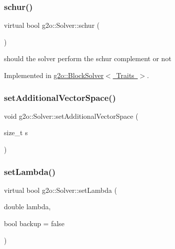 \subsubsection{\texorpdfstring{schur()}{schur()}}
{\footnotesize\ttfamily virtual bool g2o\+::\+Solver\+::schur (\begin{DoxyParamCaption}{ }\end{DoxyParamCaption})\hspace{0.3cm}{\ttfamily [pure virtual]}}



should the solver perform the schur complement or not 



Implemented in \mbox{\hyperlink{classg2o_1_1_block_solver_a382173946f1dd929a625e3708c959883}{g2o\+::\+Block\+Solver$<$ Traits $>$}}.

\mbox{\label{classg2o_1_1_solver_ad35b33cee11586c8adea12cd6949f74a}} 
\subsubsection{\texorpdfstring{set\+Additional\+Vector\+Space()}{setAdditionalVectorSpace()}}
{\footnotesize\ttfamily void g2o\+::\+Solver\+::set\+Additional\+Vector\+Space (\begin{DoxyParamCaption}\item[{size\+\_\+t}]{s }\end{DoxyParamCaption})}

\mbox{\label{classg2o_1_1_solver_a94a0d5196c7859c6c37fc2368ac56be3}} 
\subsubsection{\texorpdfstring{set\+Lambda()}{setLambda()}}
{\footnotesize\ttfamily virtual bool g2o\+::\+Solver\+::set\+Lambda (\begin{DoxyParamCaption}\item[{double}]{lambda,  }\item[{bool}]{backup = {\ttfamily false} }\end{DoxyParamCaption})\hspace{0.3cm}{\ttfamily [pure virtual]}}

